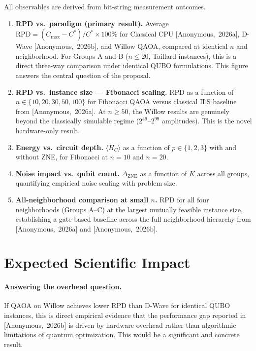 \documentclass[11pt,a4paper]{article}
\newcommand{\anonA}{[Anonymous,~2026a]}
\newcommand{\anonB}{[Anonymous,~2026b]}
\begin{document}
All observables are derived from bit-string measurement outcomes.

\begin{enumerate}

  \item \textbf{RPD vs.\ paradigm (primary result).}
        Average $\mathrm{RPD} = (C_{\max} - C^*)/C^* \times 100\%$
        for Classical CPU \anonA{}, D-Wave \anonB{}, and Willow QAOA,
        compared at identical $n$ and neighborhood. For Groups A and B
        ($n \le 20$, Taillard instances), this is a direct three-way
        comparison under identical QUBO formulations. This figure
        answers the central question of the proposal.

  \item \textbf{RPD vs.\ instance size --- Fibonacci scaling.}
        RPD as a function of $n \in \{10, 20, 30, 50, 100\}$ for
        Fibonacci QAOA versus classical ILS baseline from \anonA{}.
        At $n \ge 50$, the Willow results are genuinely beyond the
        classically simulable regime ($2^{49}$--$2^{99}$ amplitudes).
        This is the novel hardware-only result.

  \item \textbf{Energy vs.\ circuit depth.}
        $\langle H_C\rangle$ as a function of $p \in \{1,2,3\}$
        with and without ZNE, for Fibonacci at $n=10$ and $n=20$.

  \item \textbf{Noise impact vs.\ qubit count.}
        $\Delta_{\text{ZNE}}$ as a function of $K$ across all groups,
        quantifying empirical noise scaling with problem size.

  \item \textbf{All-neighborhood comparison at small $n$.}
        RPD for all four neighborhoods (Groups A--C) at the largest
        mutually feasible instance size, establishing a gate-based
        baseline across the full neighborhood hierarchy from \anonA{}
        and \anonB{}.

\end{enumerate}

\section*{Expected Scientific Impact}

\paragraph{Answering the overhead question.}
If QAOA on Willow achieves lower RPD than D-Wave for identical QUBO
instances, this is direct empirical evidence that the performance gap
reported in \anonB{} is driven by hardware overhead rather than
algorithmic limitations of quantum optimization. This would be a
significant and concrete result.
\end{document}
